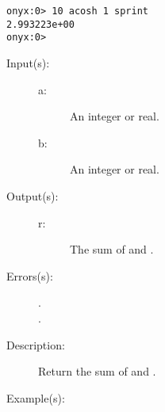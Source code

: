\begin{description}
\begin{description}
\begin{verbatim}
onyx:0> 10 acosh 1 sprint
2.993223e+00
onyx:0>
		\end{verbatim}
	\end{description}
\label{systemdict:add}
\item[{\onyxop{a b}{add}{r}}: ]
	\begin{description}\item[]
	\item[Input(s): ]
		\begin{description}\item[]
		\item[a: ]
			An integer or real.
		\item[b: ]
			An integer or real.
		\end{description}
	\item[Output(s): ]
		\begin{description}\item[]
		\item[r: ]
			The sum of  and .
		\end{description}
	\item[Errors(s): ]
		\begin{description}\item[]
		\item[.]
		\item[.]
		\end{description}
	\item[Description: ]
		Return the sum of  and .
	\item[Example(s): ]\begin{verbatim}


\end{verbatim}
\end{description}
\end{description}

